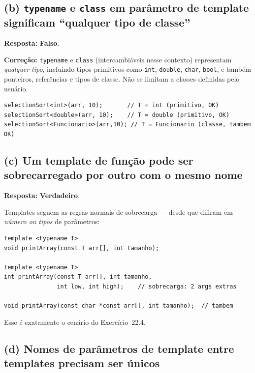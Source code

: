 \documentclass[11pt,a4paper]{article}
\begin{document}
\subsection*{(b) \texttt{typename} e \texttt{class} em par\^ametro de template significam ``qualquer tipo de classe''}

\begin{resposta}\textbf{Resposta:} \textbf{Falso}.\end{resposta}

\textbf{Corre\c{c}\~ao:} \texttt{typename} e \texttt{class} (intercambi\'aveis nesse contexto) representam \emph{qualquer tipo}, incluindo tipos primitivos como \texttt{int}, \texttt{double}, \texttt{char}, \texttt{bool}, e tamb\'em ponteiros, refer\^encias e tipos de classe. N\~ao se limitam a classes definidas pelo usu\'ario.

\begin{lstlisting}[style=cppcode,numbers=none]
selectionSort<int>(arr, 10);       // T = int (primitivo, OK)
selectionSort<double>(arr, 10);    // T = double (primitivo, OK)
selectionSort<Funcionario>(arr,10); // T = Funcionario (classe, tambem OK)
\end{lstlisting}

\subsection*{(c) Um template de fun\c{c}\~ao pode ser sobrecarregado por outro com o mesmo nome}

\begin{resposta}\textbf{Resposta:} \textbf{Verdadeiro}.\end{resposta}

Templates seguem as regras normais de sobrecarga --- desde que difiram em \emph{n\'umero ou tipos} de par\^ametros:

\begin{lstlisting}[style=cppcode,numbers=none]
template <typename T>
void printArray(const T arr[], int tamanho);

template <typename T>
int printArray(const T arr[], int tamanho,
               int low, int high);    // sobrecarga: 2 args extras

void printArray(const char *const arr[], int tamanho);  // tambem
\end{lstlisting}

Esse \'e exatamente o cen\'ario do Exerc\'icio~22.4.

\subsection*{(d) Nomes de par\^ametros de template entre templates precisam ser \'unicos}
\end{document}

